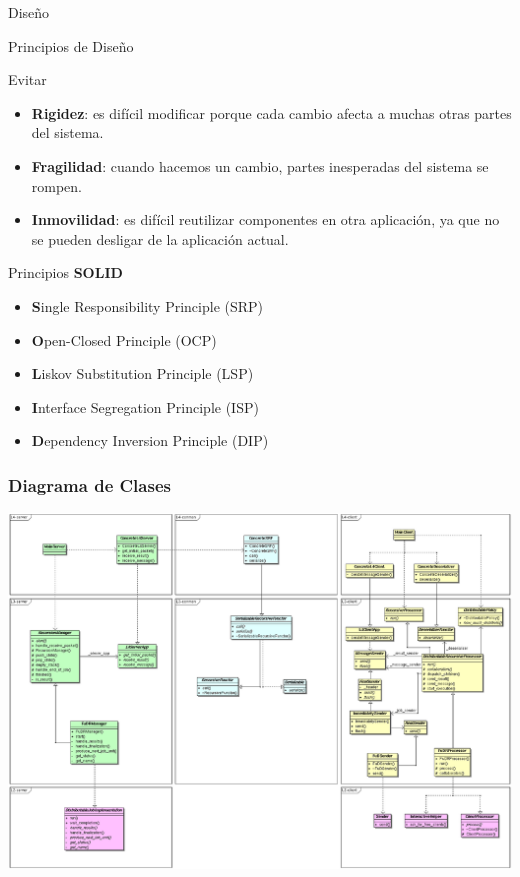 \begin{subsection}{Diseño}

\begin{frame}{Principios de Diseño}

    \begin{block}{Evitar}
        \begin{itemize}
            \item \textbf{Rigidez}: es difícil modificar porque cada cambio afecta a muchas otras partes del sistema.
            \item \textbf{Fragilidad}: cuando hacemos un cambio, partes inesperadas del sistema se rompen.
            \item \textbf{Inmovilidad}: es difícil reutilizar componentes en otra aplicación, ya que no se pueden desligar de la       
                aplicación actual.
        \end{itemize}
    \end{block}

    \begin{block}{Principios \textbf{SOLID}}
        \begin{itemize}
            \item   \textbf{S}ingle Responsibility Principle (SRP)
            \item   \textbf{O}pen-Closed Principle (OCP)
            \item   \textbf{L}iskov Substitution Principle (LSP)
            \item   \textbf{I}nterface Segregation Principle (ISP)
            \item   \textbf{D}ependency Inversion Principle (DIP)
        \end{itemize}
    \end{block}
\end{frame}

\begin{frame}\frametitle{Diagrama de Clases}
    \begin{center}
        \includegraphics[scale=0.25]{images/class.png}
    \end{center}
\end{frame}



\end{subsection}
